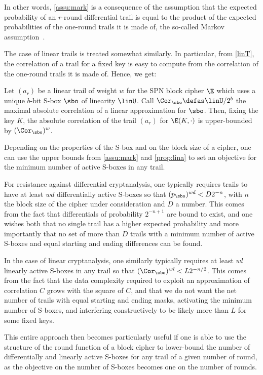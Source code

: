 In other words, \autoref{assu:mark} is a consequence of the assumption that the expected probability of an $r$-round
differential trail is equal to the
product of the expected probabilities of the one-round trails it is made of, \ie the so-called Markov assumption~\cite{idea}.

The case of linear trails is treated somewhat similarly. In particular, from \autoref{linT}, the correlation of
a trail for a fixed key is easy to compute from the correlation of the one-round trails it is made of. Hence, we get:

\begin{prop}
\label{prop:lina}
Let $(a_r)$ be a linear trail of weight $w$ for the SPN block cipher $\E$ which uses a unique $b$-bit S-box $\sbo$ of linearity
$\linU$. Call $\Cor_{\sbo} \defas \linU/2^b$ the maximal absolute correlation of a linear approximation for $\sbo$.
Then, fixing the key $K$, the absolute correlation of the trail $(a_r)$ for $\E(K,\cdot)$ is upper-bounded by $(\Cor_{\sbo})^w$.
\end{prop}

Depending on the properties of the S-box and on the block size of a cipher, one can use the upper bounds
from \autoref{assu:mark} and \autoref{prop:lina} to set an objective for the minimum number of active S-boxes in any trail.

For resistance against differential cryptanalysis, one typically requires trails to have at least $\mathit{wd}$ differentially active
S-boxes so that $(p_{\sbo})^\mathit{wd} < D2^{-n}$, with $n$ the block size of the cipher under consideration and
$D$ a number. This comes from
the fact that differentials of probability $2^{-n+1}$ are bound to exist, and one wishes both that no single trail has a
higher expected probability and more importantly that no set of more than $D$ trails with a minimum number of active
S-boxes and equal starting and ending differences can be found.

In the case of linear cryptanalysis, one similarly typically requires at least $\mathit{wl}$ linearly active
S-boxes in any trail so that $(\Cor_{\sbo})^\mathit{wl} < L2^{-n/2}$. This comes from the fact that the data complexity required to exploit
an approximation of correlation $C$ grows with the square of $C$, and that we do not want the net number of trails with
equal starting and ending masks, activating
the minimum number of S-boxes, and interfering constructively
to be likely more than $L$ for some fixed keys.

This entire approach then becomes particularly useful if one is able to use the structure of the round function of a block cipher to lower-bound the
number of differentially and linearly active S-boxes for any trail of a given number of round, as the objective on the number
of S-boxes becomes one on the number of rounds.
